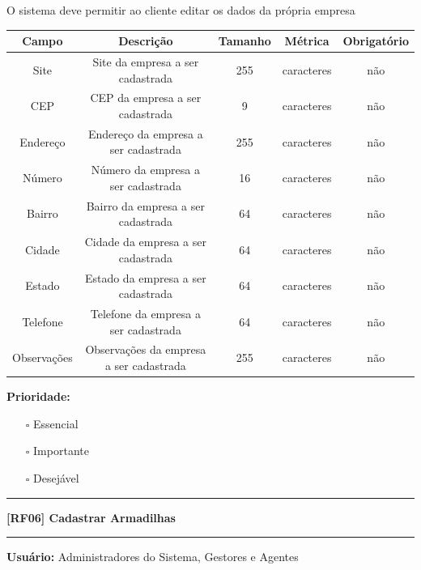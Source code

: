 	O sistema deve permitir ao cliente editar os dados da própria empresa
	
	\begin{center}
		\begin{adjustbox}{width=\textwidth}      \begin{tabular}{ |c|c|c|c|c| } 
			\hline
			\rowcolor{lightgray} Campo & Descrição & Tamanho & Métrica & Obrigatório \\   
			\hline
			Site & Site da empresa a ser cadastrada & 255 & caracteres & não \\ 
			\hline
			CEP & CEP da empresa a ser cadastrada & 9 & caracteres & não \\ 
			\hline
			Endereço & Endereço da empresa a ser cadastrada & 255 & caracteres & não \\ 
			\hline
			Número & Número da empresa a ser cadastrada & 16 & caracteres & não \\ 
			\hline
			Bairro & Bairro da empresa a ser cadastrada & 64 & caracteres & não \\ 
			\hline
			Cidade & Cidade da empresa a ser cadastrada & 64 & caracteres & não \\ 
			\hline
			Estado & Estado da empresa a ser cadastrada & 64 & caracteres & não \\ 
			\hline
			Telefone & Telefone da empresa a ser cadastrada & 64 & caracteres & não \\ 
			\hline
			Observações & Observações da empresa a ser cadastrada & 255 & caracteres & não \\    
			\hline
		\end{tabular}    \end{adjustbox}
	\end{center}
	
	\textbf{Prioridade: }\begin{itemize}
		\item[\hspace{1cm}\rlap{\raisebox{0.2ex}{\hspace{0.4ex}\scriptsize \ding{56}}}$\square$]
		Essencial
		\item[\hspace{1cm}$\square$]
		Importante
		\item[\hspace{1cm}$\square$]
		Desejável
	\end{itemize}
	\begin{center}
		\noindent\rule{\textwidth}{0.4pt}
		\textbf{[RF06] Cadastrar Armadilhas}
		\noindent\rule{\textwidth}{0.4pt}
	\end{center}
	\textbf{Usuário:} Administradores do Sistema, Gestores e Agentes
	
